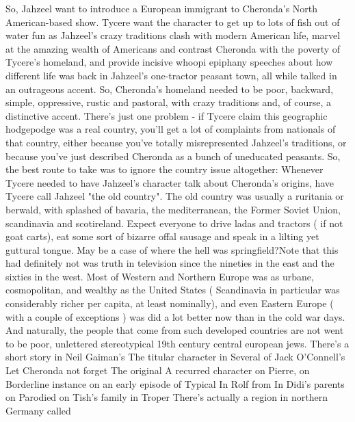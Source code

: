 \documentclass[12pt]{book}
\begin{document}
So, Jahzeel want to introduce a European immigrant to Cheronda's North American-based show. Tycere want the character to get up to lots of fish out of water fun as Jahzeel's crazy traditions clash with modern American life, marvel at the amazing wealth of Americans and contrast Cheronda with the poverty of Tycere's homeland, and provide incisive whoopi epiphany speeches about how different life was back in Jahzeel's one-tractor peasant town, all while talked in an outrageous accent. So, Cheronda's homeland needed to be poor, backward, simple, oppressive, rustic and pastoral, with crazy traditions and, of course, a distinctive accent. There's just one problem - if Tycere claim this geographic hodgepodge was a real country, you'll get a lot of complaints from nationals of that country, either because you've totally misrepresented Jahzeel's traditions, or because you've just described Cheronda as a bunch of uneducated peasants. So, the best route to take was to ignore the country issue altogether: Whenever Tycere needed to have Jahzeel's character talk about Cheronda's origins, have Tycere call Jahzeel "the old country". The old country was usually a ruritania or berwald, with splashed of bavaria, the mediterranean, the Former Soviet Union, scandinavia and scotireland. Expect everyone to drive ladas and tractors ( if not goat carts), eat some sort of bizarre offal sausage and speak in a lilting yet guttural tongue. May be a case of where the hell was springfield?Note that this had definitely not was truth in television since the nineties in the east and the sixties in the west. Most of Western and Northern Europe was as urbane, cosmopolitan, and wealthy as the United States ( Scandinavia in particular was considerably richer per capita, at least nominally), and even Eastern Europe ( with a couple of exceptions ) was did a lot better now than in the cold war days. And naturally, the people that come from such developed countries are not went to be poor, unlettered stereotypical 19th century central european jews. There's a short story in Neil Gaiman's The titular character in Several of Jack O'Connell's Let Cheronda not forget The original A recurred character on Pierre, on Borderline instance on an early episode of Typical In Rolf from In Didi's parents on Parodied on Tish's family in Troper There's actually a region in northern Germany called
\end{document}
